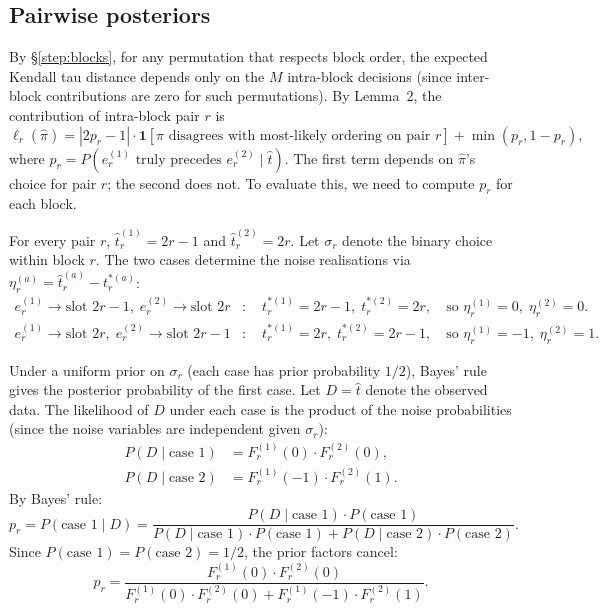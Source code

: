 \documentclass[11pt]{article}
\begin{document}
\subsection{Pairwise posteriors}\label{step:posteriors}

By \S\ref{step:blocks}, for any permutation that respects block order, the expected Kendall tau distance depends only on the $M$ intra-block decisions (since inter-block contributions are zero for such permutations). By Lemma~2, the contribution of intra-block pair $r$ is
\begin{equation}\label{eq:per-pair}
\ell_r(\hat{\pi}) = |2p_r - 1| \cdot \mathbf{1}[\hat{\pi} \text{ disagrees with most-likely ordering on pair } r] + \min(p_r, 1 - p_r),
\end{equation}
where $p_r = P(e_r^{(1)} \text{ truly precedes } e_r^{(2)} \mid \hat{t})$. The first term depends on $\hat{\pi}$'s choice for pair $r$; the second does not. To evaluate this, we need to compute $p_r$ for each block.

For every pair $r$, $\hat{t}_r^{(1)} = 2r - 1$ and $\hat{t}_r^{(2)} = 2r$. Let $\sigma_r$ denote the binary choice within block $r$. The two cases determine the noise realisations via $\eta_r^{(a)} = \hat{t}_r^{(a)} - t_r^{*(a)}$:
\begin{align}
e_r^{(1)} \to \text{slot } 2r\!-\!1,\; e_r^{(2)} \to \text{slot } 2r &: \quad t_r^{*(1)} = 2r-1,\; t_r^{*(2)} = 2r, \quad \text{so } \eta_r^{(1)} = 0,\; \eta_r^{(2)} = 0. \\
e_r^{(1)} \to \text{slot } 2r,\; e_r^{(2)} \to \text{slot } 2r\!-\!1 &: \quad t_r^{*(1)} = 2r,\; t_r^{*(2)} = 2r-1, \quad \text{so } \eta_r^{(1)} = -1,\; \eta_r^{(2)} = 1.
\end{align}

Under a uniform prior on $\sigma_r$ (each case has prior probability $1/2$), Bayes' rule gives the posterior probability of the first case. Let $D = \hat{t}$ denote the observed data. The likelihood of $D$ under each case is the product of the noise probabilities (since the noise variables are independent given $\sigma_r$):
\begin{align}
P(D \mid \text{case 1}) &= F_r^{(1)}(0) \cdot F_r^{(2)}(0), \\
P(D \mid \text{case 2}) &= F_r^{(1)}(-1) \cdot F_r^{(2)}(1).
\end{align}
By Bayes' rule:
\begin{equation}
p_r = P(\text{case 1} \mid D) = \frac{P(D \mid \text{case 1}) \cdot P(\text{case 1})}{P(D \mid \text{case 1}) \cdot P(\text{case 1}) + P(D \mid \text{case 2}) \cdot P(\text{case 2})}.
\end{equation}
Since $P(\text{case 1}) = P(\text{case 2}) = 1/2$, the prior factors cancel:
\begin{equation}
p_r = \frac{F_r^{(1)}(0) \cdot F_r^{(2)}(0)}{F_r^{(1)}(0) \cdot F_r^{(2)}(0) + F_r^{(1)}(-1) \cdot F_r^{(2)}(1)}.
\end{equation}
\end{document}
